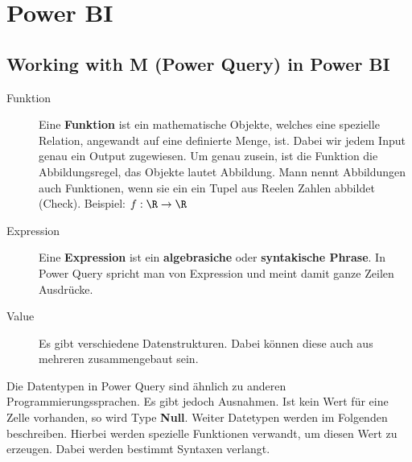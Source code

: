 \pagebreak
\chapter{Power BI}
\setcounter{section}{0}

\section{Working with M (Power Query) in Power BI}
\begin{description}
\item[Funktion] Eine \textbf{Funktion} ist ein mathematische Objekte, welches eine spezielle Relation, angewandt auf eine definierte Menge, ist. Dabei wir jedem Input genau ein Output zugewiesen. Um genau zusein, ist die Funktion die Abbildungsregel, das Objekte lautet Abbildung. Mann nennt Abbildungen auch Funktionen, wenn sie ein ein Tupel aus Reelen Zahlen abbildet (Check). Beispiel: $f:\R \rightarrow \R$
\item[Expression] Eine \textbf{Expression} ist ein \textbf{algebrasiche} oder \textbf{syntakische Phrase}. In Power Query spricht man von Expression und meint damit ganze Zeilen Ausdrücke. 
\item[Value] Es gibt verschiedene Datenstrukturen. Dabei können diese auch aus mehreren zusammengebaut sein. 
\end{description}

Die Datentypen in Power Query sind ähnlich zu anderen Programmierungssprachen. Es gibt jedoch Ausnahmen. Ist kein Wert für eine Zelle vorhanden, so wird Type \textbf{Null}. Weiter Datetypen werden im Folgenden beschreiben. Hierbei werden spezielle Funktionen verwandt, um diesen Wert zu erzeugen. Dabei werden bestimmt Syntaxen verlangt.\\

